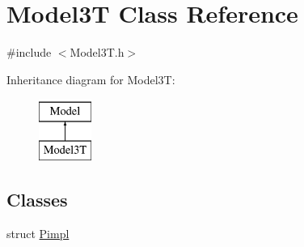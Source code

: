 \hypertarget{classModel3T}{}\section{Model3T Class Reference}
\label{classModel3T}


{\ttfamily \#include $<$Model3\+T.\+h$>$}

Inheritance diagram for Model3T\+:\begin{figure}[H]
\begin{center}
\leavevmode
\includegraphics[height=2.000000cm]{d3/d33/classModel3T}
\end{center}
\end{figure}
\subsection*{Classes}
\begin{DoxyCompactItemize}
\item 
struct \hyperlink{structModel3T_1_1Pimpl}{Pimpl}
\end{DoxyCompactItemize}
